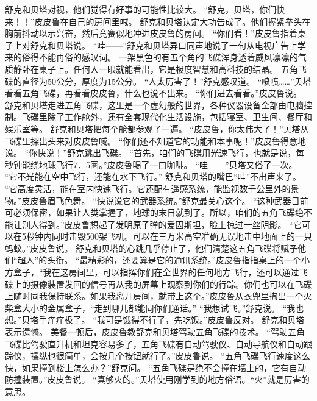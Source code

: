 \documentclass[a4paper,12pt,UTF8,twoside]{ctexbook}
\begin{document}
        舒克和贝塔对视，他们觉得有好事的可能性比较大。 
        “舒克，贝塔，你们快来！！”皮皮鲁在自己的房间里喊。 
        舒克和贝塔认定大功告成了。他们握紧拳头在胸前抖动以示兴奋，然后竞赛似地冲进皮皮鲁的房间。 
        “你们看！”皮皮鲁指着桌子上对舒克和贝塔说。 
        “哇——”舒克和贝塔异口同声地说了一句从电视广告上学来的俗得不能再俗的感叹词。 
        一架黑色的有五个角的飞碟浑身透着威风凛凛的气质静卧在桌子上。任何人一眼就能看出，它是极度智慧和高科技的结晶。 
        五角飞碟的直径为50公分，厚度为15公分。 
        “人太厉害了！”舒克感叹道。 
        “喷喷……”贝塔看看五角飞碟，再看看皮皮鲁，什么也说不出来。 
        “你们进去看看。”皮皮鲁说。 
        舒克和贝塔走进五角飞碟，这里是一个虚幻般的世界，各种仪器设备全部由电脑控制。飞碟里除了工作舱外，还有全套现代化生活设施，包括寝室、卫生间、餐厅和娱乐室等。 
        舒克和贝塔把每个舱都参观了一遍。 
        “皮皮鲁，你太伟大了！”贝塔从飞碟里探出头来对皮皮鲁喊。 
        “你们还不知道它的功能和本事呢！”皮皮鲁得意地说。 
        “你快说！”舒克跳出飞碟。 
        “首先，咱们的飞碟用光速飞行，也就是说，每秒钟能绕地球飞行7．5圈。”皮皮鲁喝了一口咖啡。 
        “哇——”贝塔又俗了一次。 
        “它不光能在空中飞行，还能在水下飞行。” 
        舒克和贝塔的嘴巴“哇”不出声来了。 
        “它高度灵活，能在室内快速飞行。它还配有遥感系统，能监视数千公里外的景物。”皮皮鲁眉飞色舞。 
        “快说说它的武器系统。”舒克最关心这个。 
        “这种武器目前可必须保密，如果让人类掌握了，地球的末日就到了。所以，咱们的五角飞碟绝不能让别人得到。”皮皮鲁想起了发明原子弹的爱因斯坦，脸上掠过一丝阴影。 
        “它可以在5秒钟内同时击毁500架飞机。可以在三万米高空准确无误地击中地面上的一只蚂蚁。”皮皮鲁说。 
        舒克和贝塔的心跳几乎停止了，他们清楚这五角飞碟将赋予他们“超人”的头衔。 
        “最精彩的，还要算是它的通讯系统。”皮皮鲁指指桌上的一个小方盒子，“我在这房间里，可以指挥你们在全世界的任何地方飞行，还可以通过飞碟上的摄像装置发回的信号再从我的屏幕上观察到你们的行踪。你们也可以在飞碟上随时同我保持联系。如果我离开房间，就带上这个。”皮皮鲁从衣兜里掏出一个火柴盒大小的金属盒子，“走到哪儿都能同你们通话。” 
        “我想试飞。”舒克说。 
        “我也想。”贝塔手痒痒极了。 
        “我可是饿得不行了，先吃饭。”皮皮鲁反对。 
        舒克和贝塔表示遗憾。 
        美餐一顿后，皮皮鲁教舒克和贝塔驾驶五角飞碟的技术。 
        “驾驶五角飞碟比驾驶直升机和坦克容易多了，五角飞碟有自动驾驶仪、自动导航仪和自动跟踪仪，操纵也很简单，会按几个按钮就行了。”皮皮鲁说。 
        “五角飞碟飞行速度这么快，如果撞到楼上怎么办？”舒克问。 
        “五角飞碟是绝不会撞在墙上的，它有自动防撞装置。”皮皮鲁说。 
        “真够火的。”贝塔使用刚学到的地方俗语。“火”就是厉害的意思。 
\end{document}

